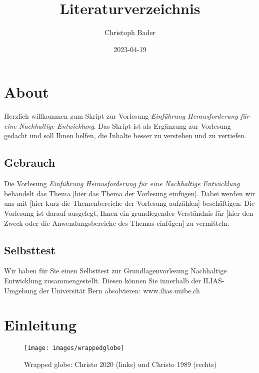 \documentclass[
]{book}
\title{Literaturverzeichnis}
\author{Christoph Bader}
\date{2023-04-19}
\begin{document}
\maketitle

{
\setcounter{tocdepth}{1}
\tableofcontents
}
\hypertarget{about}{%
\chapter{About}\label{about}}

Herzlich willkommen zum Skript zur Vorlesung \emph{Einführung Herausforderung für eine Nachhaltige Entwicklung}. Das Skript ist als Ergänzung zur Vorlesung gedacht und soll Ihnen helfen, die Inhalte besser zu verstehen und zu vertiefen.

\hypertarget{gebrauch}{%
\section{Gebrauch}\label{gebrauch}}

Die Vorlesung \emph{Einführung Herausforderung für eine Nachhaltige Entwicklung} behandelt das Thema {[}hier das Thema der Vorlesung einfügen{]}. Dabei werden wir uns mit {[}hier kurz die Themenbereiche der Vorlesung aufzählen{]} beschäftigen. Die Vorlesung ist darauf ausgelegt, Ihnen ein grundlegendes Verständnis für {[}hier den Zweck oder die Anwendungsbereiche des Themas einfügen{]} zu vermitteln.

\hypertarget{selbsttest}{%
\section{Selbsttest}\label{selbsttest}}

Wir haben für Sie einen Selbsttest zur Grundlagenvorlesung Nachhaltige Entwicklung zusammengestellt. Diesen können Sie innerhalb der ILIAS-Umgebung der Universität Bern absolvieren:
www.ilias.unibe.ch

\hypertarget{einleitung}{%
\chapter{Einleitung}\label{einleitung}}

\begin{figure}

{\centering \texttt{[image: images/wrappedglobe]} 

}

\caption{Wrapped globe: Christo 2020 (links) und Christo 1989 (rechts)}\label{fig:wrappedglobe}
\end{figure}
\end{document}
